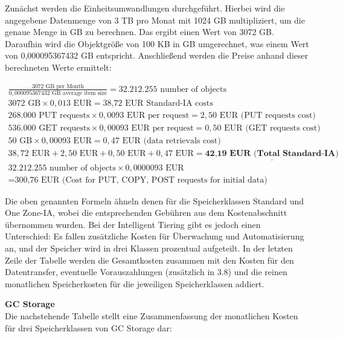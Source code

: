 Zunächst werden die Einheitsumwandlungen durchgeführt. Hierbei wird die angegebene Datenmenge von 3 TB pro Monat mit 1024 GB multipliziert, um die genaue Menge in GB zu berechnen. Das ergibt einen Wert von 3072 GB. Daraufhin wird die Objektgröße von 100 KB in GB umgerechnet, was einem Wert von 0,000095367432 GB entspricht. Anschließend werden die Preise anhand dieser berechneten Werte ermittelt:

\begin{align}
	\frac{3072 \text{ GB per Month}}{0,000095367432 \text{ GB average item size}} = 32.212.255 \text{ number of objects}\\
	3072 \text{ GB} \times 0,013 \text{ EUR} = \text{38,72 EUR Standard-IA costs}\\
	268.000 \text{ PUT requests} \times 0,0093 \text{ EUR per request} = 2,50 \text{ EUR (PUT requests cost)}\\
	536.000 \text{ GET requests} \times 0,00093 \text{ EUR per request} = 0,50 \text{ EUR (GET requests cost)}\\
	50 \text{ GB} \times 0,00093 \text{ EUR} = 0,47 \text{ EUR (data retrievals cost)}\\
	38,72 \text{ EUR} + 2,50 \text{ EUR} + 0,50 \text{ EUR} + 0,47 \text{ EUR} = \underline{\textbf{42,19  EUR (Total Standard-IA)}}\\
	32.212.255 \text{ number of objects} \times 0,0000093 \text{ EUR} \\ = \text{300,76 EUR (Cost for PUT, COPY, POST requests for initial data)}
\end{align}

Die oben genannten Formeln ähneln denen für die Speicherklassen Standard und One Zone-IA, wobei die entsprechenden Gebühren aus dem Kostenabschnitt übernommen wurden. Bei der Intelligent Tiering gibt es jedoch einen Unterschied: Es fallen zusätzliche Kosten für Überwachung und Automatisierung an, und der Speicher wird in drei Klassen prozentual aufgeteilt. In der letzten Zeile der Tabelle werden die Gesamtkosten zusammen mit den Kosten für den Datentransfer, eventuelle Vorauszahlungen (zusätzlich in 3.8) und die reinen monatlichen Speicherkosten für die jeweiligen Speicherklassen addiert.

\newpage
\textbf{GC Storage}\\

Die nachstehende Tabelle stellt eine Zusammenfassung der monatlichen Kosten für drei Speicherklassen von GC Storage dar:

